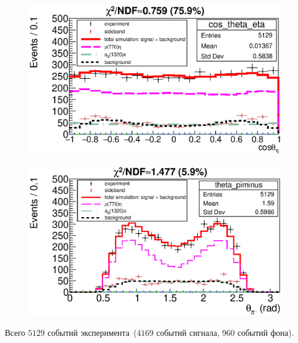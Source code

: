\documentclass{beamer}
\begin{document}
\begin{frame}
\begin{minipage}[t]{0.48\linewidth}
\begin{figure}
    \end{figure}
  \end{minipage}
  \begin{minipage}[t]{0.48\linewidth}
    \begin{figure}
      \includegraphics[width=\linewidth]{figures/cos_theta_eta_g950.eps}
    \end{figure}
  \end{minipage}
  \begin{minipage}[t]{0.48\linewidth}
    \begin{figure}
      \includegraphics[width=\linewidth]{figures/theta_piminus_g950.eps}
    \end{figure}
  \end{minipage}
  \scriptsize
  Всего $5129$ событий эксперимента~($4169$ событий сигнала, $960$ событий фона).
\end{frame}
\end{document}
